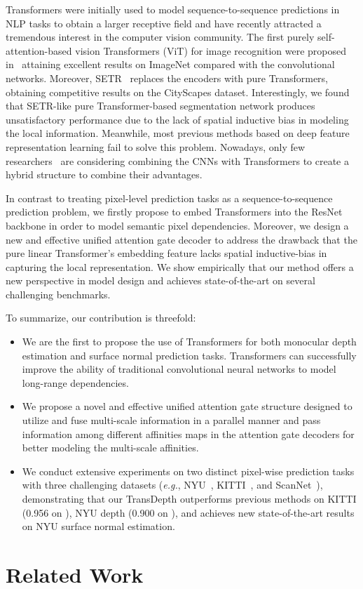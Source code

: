 \documentclass[10pt,twocolumn,letterpaper]{article}
\begin{document}
Transformers were initially used to model sequence-to-sequence predictions in NLP tasks to obtain a larger receptive field and have  recently attracted a tremendous interest in the computer vision community. The first purely self-attention-based vision Transformers (ViT) for image recognition were proposed in~\cite{dosovitskiy2020image} attaining excellent results on ImageNet compared with the convolutional networks. 
Moreover, SETR~\cite{zheng2020rethinking} replaces the encoders with pure Transformers, obtaining competitive results on the CityScapes dataset. Interestingly, we found that SETR-like pure Transformer-based segmentation network produces unsatisfactory performance due to the lack of spatial inductive bias in modeling the local information. Meanwhile, most previous methods based on deep feature representation learning fail to solve this problem. 
Nowadays, only few researchers~\cite{carion2020end} are considering combining the CNNs with Transformers to create a hybrid structure to combine their advantages.

In contrast to treating pixel-level prediction tasks as a sequence-to-sequence prediction problem, we firstly propose to embed Transformers into the ResNet backbone in order to model semantic pixel dependencies. Moreover, we design a new and effective unified attention gate decoder to address the drawback that the pure linear Transformer's embedding feature lacks spatial inductive-bias in capturing the local representation. We show empirically that our method offers a new perspective in model design and achieves state-of-the-art on several challenging benchmarks.

To summarize, our contribution is threefold:
\begin{itemize}[leftmargin=*]
\item We are the first to propose the use of Transformers for both monocular depth estimation and surface normal prediction tasks.  Transformers can successfully improve the ability of traditional convolutional neural networks to model long-range dependencies.
\item We propose a novel and effective unified attention gate structure designed to utilize and fuse multi-scale information in a parallel manner and pass information among different affinities maps in the attention gate decoders for better modeling the multi-scale affinities.
\item We conduct extensive experiments on two distinct pixel-wise prediction tasks with three challenging datasets (\textit{e.g.}, NYU~\cite{silberman2012indoor}, KITTI~\cite{Geiger2013IJRR}, and ScanNet~\cite{dai2017scannet}), demonstrating that our TransDepth outperforms previous methods on KITTI (0.956 on ), NYU depth (0.900 on ), and achieves new state-of-the-art results on NYU surface normal estimation.
\end{itemize} \section{Related Work}
\end{document}
